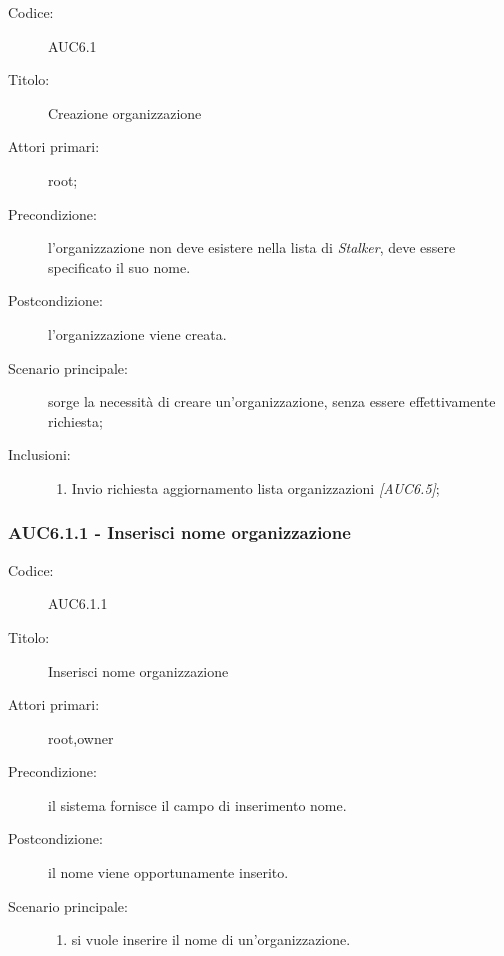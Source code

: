 \documentclass[casi-duso]{subfiles}
\begin{document}
  \begin{description}
    \item[Codice:] AUC6.1
    \item[Titolo:] Creazione organizzazione
    \item[Attori primari:] root;
    \item[Precondizione:] l'organizzazione non deve esistere nella lista di \emph{Stalker}, deve essere specificato il suo nome.
    \item[Postcondizione:] l'organizzazione viene creata.
    \item[Scenario principale:] sorge la necessità di creare un'organizzazione, senza essere effettivamente richiesta;
    \item[Inclusioni:]
    \begin{enumerate}
      \item Invio richiesta aggiornamento lista organizzazioni \emph{[AUC6.5]};
    \end{enumerate}
  \end{description}

  \subsubsection{AUC6.1.1 - Inserisci nome organizzazione}%
  \label{subsub:AUC6.1.1}
  \begin{description}
    \item[Codice:] AUC6.1.1
    \item[Titolo:] Inserisci nome organizzazione
    \item[Attori primari:] root,owner
    \item[Precondizione:] il sistema fornisce il campo di inserimento nome.
    \item[Postcondizione:] il nome viene opportunamente inserito.
    \item[Scenario principale:] 
    \begin{enumerate}
      \item si vuole inserire il nome di un'organizzazione.
    \end{enumerate}
    
  \end{description}
  
\end{document}
